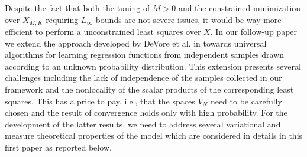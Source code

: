 Despite the fact that both the tuning of $M>0$ and the constrained minimization over $X_{M,K}$  requiring $L_\infty$ bounds are not severe issues, it would be way more efficient to perform a unconstrained least squares over $X$. In our follow-up paper \cite{bofohamaXX} we extend the approach developed by DeVore et al. in \cite{MR2249856,MR2327596} towards universal algorithms for learning regression functions from independent samples drawn according to an unknown probability distribution. This extension presents several challenges including the lack of independence of the samples collected in our framework and the nonlocality of the scalar products of the corresponding least squares. This has a price to pay, i.e., that  the spaces $V_N$ need to be carefully chosen and the result of convergence holds only with high probability.  
For the development of the latter results, we need to address several variational and measure theoretical properties of the model which are considered in details in this first paper as reported below.